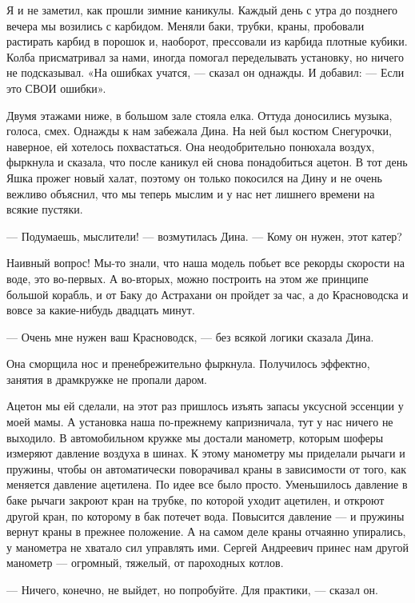 Я и не заметил, как прошли зимние каникулы. Каждый день с утра до позднего
вечера мы  возились  с карбидом.  Меняли  баки, трубки,  краны,  пробовали
растирать карбид  в порошок  и, наоборот,  прессовали из  карбида  плотные
кубики. Колба присматривал за нами, иногда помогал переделывать установку,
но ничего  не подсказывал.  «На ошибках  учатся, —  сказал он  однажды.  И
добавил: — Если это СВОИ ошибки».

Двумя этажами ниже, в большом зале стояла елка. Оттуда доносились  музыка,
голоса, смех. Однажды к нам забежала  Дина. На ней был костюм  Снегурочки,
наверное, ей хотелось  похвастаться. Она  неодобрительно понюхала  воздух,
фыркнула и сказала, что после каникул  ей снова понадобиться ацетон. В  тот
день Яшка прожег  новый халат,  поэтому он только  покосился на  Дину и  не
очень вежливо объяснил, что мы теперь  мыслим и у нас нет лишнего  времени
на всякие пустяки.

— Подумаешь, мыслители! — возмутилась Дина. — Кому он нужен, этот катер?

Наивный вопрос! Мы-то знали, что  наша модель побьет все рекорды  скорости
на воде, это во-первых. А во-вторых,  можно построить на этом же  принципе
большой корабль,  и  от  Баку  до  Астрахани  он  пройдет  за  час,  а  до
Красноводска и вовсе за какие-нибудь двадцать минут.

— Очень мне нужен ваш Красноводск, — без всякой логики сказала Дина.

Она сморщила нос и пренебрежительно фыркнула. Получилось эффектно, занятия
в драмкружке не пропали даром.

Ацетон мы ей сделали, на этот раз пришлось изъять запасы уксусной эссенции
у моей мамы. А установка наша  по-прежнему капризничала, тут у нас  ничего
не выходило. В  автомобильном кружке мы  достали манометр, которым  шоферы
измеряют давление воздуха в шинах. К этому манометру мы приделали рычаги и
пружины, чтобы он автоматически поворачивал  краны в зависимости от  того,
как меняется  давление ацетилена.  По идее  все было  просто.  Уменьшилось
давление в баке рычаги закроют кран на трубке, по которой уходит ацетилен,
и откроют другой кран, по которому в бак потечет вода. Повысится  давление
— и  пружины вернут  краны в  прежнее  положение. А  на самом  деле  краны
отчаянно упирались,  у  манометра не  хватало  сил управлять  ими.  Сергей
Андреевич принес нам  другой манометр —  огромный, тяжелый, от  пароходных
котлов.

— Ничего, конечно, не выйдет, но попробуйте. Для практики, — сказал он.


